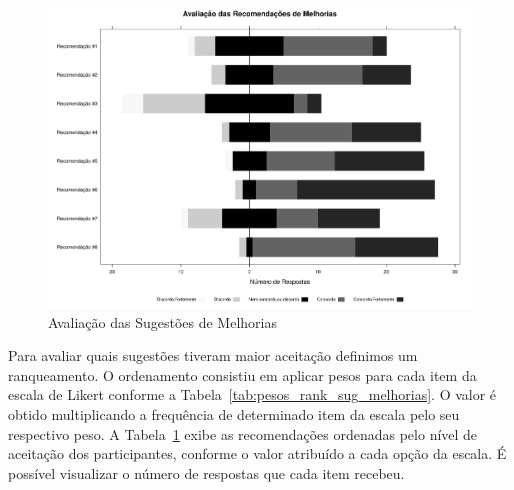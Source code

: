 \begin{figure}[htpb]
    \centering
    \includegraphics[width=.9\linewidth]{chapter-sugestoes-melhorias-fgrm/img/plot_likert_avaliacao_sug_melhorias_grayscale.pdf}
    \caption{Avaliação das Sugestões de Melhorias}\label{fig:plot_likert_avaliacao_sug_melhorias}
\end{figure}

Para avaliar quais sugestões tiveram maior aceitação definimos um ranqueamento.
O ordenamento consistiu em aplicar pesos para cada item da escala de Likert
conforme a Tabela~\ref{tab:pesos_rank_sug_melhorias}. O valor é obtido
multiplicando a frequência de determinado item da escala pelo seu respectivo
peso. A Tabela~\ref{fig:plot_likert_avaliacao_sug_melhorias} exibe as
recomendações ordenadas pelo nível de aceitação dos participantes, conforme o
valor atribuído a cada opção da escala. É possível visualizar o número de
respostas que cada item recebeu.

\begin{table}[htpb]
\centering
{}
\caption{Pesos utilizados para ordenar as sugestões propostas.}\label{tab:pesos_rank_sug_melhorias}
\end{table}

